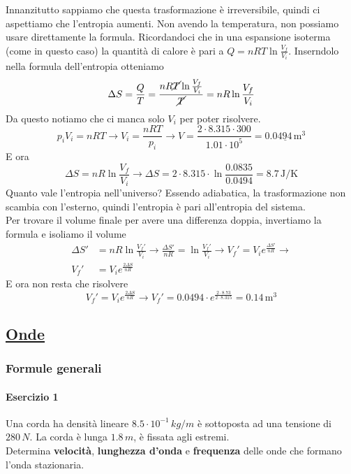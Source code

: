 Innanzitutto sappiamo che questa trasformazione è irreversibile, quindi ci aspettiamo che l'entropia
aumenti. Non avendo la temperatura, non possiamo usare direttamente la formula. Ricordandoci che in 
una espansione isoterma (come in questo caso) la quantità di calore è pari a 
$Q = nRT\ln\frac{V_f}{V_i}$. Inserndolo nella formula dell'entropia otteniamo
\begin{equation*}
\Delta S = \frac{Q}{T} = \frac{nR\cancel{T}\ln\frac{V_f}{V_i}}{\cancel{T}} = nR\ln\frac{V_f}{V_i}
\end{equation*}
Da questo notiamo che ci manca solo $V_i$ per poter risolvere.
\begin{equation*}
p_iV_i = nRT \rightarrow V_i = \frac{nRT}{p_i} \rightarrow V =
\frac{2\cdot8.315\cdot300}{1.01\cdot10^5} = 
\underline{0.0494\,\text{m}^3}
\end{equation*}
E ora
\begin{equation*}
\Delta S = nR\ln\frac{V_f}{V_i} \rightarrow \Delta S = 2\cdot8.315\cdot\ln\frac{0.0835}{0.0494} =
\boxed{8.7\,\text{J/K}}
\end{equation*}
Quanto vale l'entropia nell'universo? Essendo adiabatica, la trasformazione non scambia con l'esterno,
quindi l'entropia è pari all'entropia del sistema.\\
Per trovare il volume finale per avere una differenza doppia, invertiamo la formula e isoliamo il 
volume
\begin{align*}
\Delta S' &= nR\ln\frac{V_f'}{V_i} \rightarrow \frac{\Delta S'}{nR} = \ln\frac{V_f'}{V_i} \rightarrow
V_f' = V_ie^{\frac{\Delta S'}{nR}} \rightarrow\\ 
V_f' &= V_ie^{\frac{2\Delta S}{nR}}
\end{align*}
E ora non resta che risolvere
\begin{equation*}
V_f' = V_ie^{\frac{2\Delta S}{nR}} \rightarrow V_f' = 0.0494\cdot e^{\frac{2\cdot8.73}{2\cdot8.315}} =
\boxed{0.14\,\text{m}^3}
\end{equation*}

\subsection*{\hyperref[sec:onde]{Onde}}\label{ex:onde}

\subsubsection*{Formule generali}
\paragraph{Esercizio 1}
Una corda ha densità lineare $8.5\cdot 10^{-1}\,kg/m$ è sottoposta ad una tensione di 
$280\,N$. La corda è lunga $1.8\,m$, è fissata agli estremi.\\
Determina \textbf{velocità}, \textbf{lunghezza d'onda} e \textbf{frequenza} delle onde che formano
l'onda stazionaria.
\divisor

